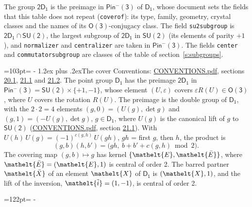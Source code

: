 \documentclass[10pt,a4paper]{article}
\makeatletter
\renewcommand\section{\@startsection{section}{1}{\z@}{-3ex plus -1ex minus -.2ex}%
  {1.2ex plus .2ex}{\normalfont\large\sffamily\bfseries\color{parttitle}}}
\newcommand{\needspace}[1]{\par\penalty-100\begingroup\dimen0=#1\relax\dimen2=\pagegoal
  \advance\dimen2-\pagetotal\ifdim\dimen0>\dimen2\relax\ifdim\dimen2>0pt\vfil\break\fi\fi
  \endgroup}
\numberwithin{equation}{section}
\newcommand{\eltfont}[1]{{\let\sigma\eltsigma\mathelt{#1}}}
\newcommand{\grp}[1]{\mathsf{#1}}
\newcommand{\elt}[1]{\eltfont{#1}}
\newcommand{\dirprod}{\times}
\newcommand{\barred}[1]{\bar{#1}}
\newcommand{\lift}[1]{\tilde{#1}}
\makeatother
\begin{document}
\leavevmode\label{n:element.inversion}\label{n:group.preimage}The group $\grp{2D_{1}}$ is the preimage in $\grp{Pin^{-}(3)}$ of \href{../../../rotation/data/pdf/D1.pdf}{$\grp{D_{1}}$}, whose document sets the fields that this table does not repeat (\texttt{coverof}): its type, family, geometry, crystal classes and the names of its \href{../../../rotation/data/pdf/O3.pdf}{$\grp{O(3)}$}-conjugacy class. The field \texttt{su2subgroup} is $\grp{2D_{1}} \cap \grp{SU(2)}$, the largest subgroup of $\grp{2D_{1}}$ in $\grp{SU(2)}$ (its elements of parity $+1$), and \texttt{normalizer} and \texttt{centralizer} are taken in $\grp{Pin^{-}(3)}$. The fields \texttt{center} and \texttt{commutatorsubgroup} are classes of the table of section~\ref{s:subgroups}.
\needspace{103pt}
\section{The cover}\label{s:cover}
Conventions: \href{../../CONVENTIONS.pdf}{CONVENTIONS.pdf}, sections \href{../../CONVENTIONS.pdf\#conv.20.1}{20.1}, \href{../../CONVENTIONS.pdf\#conv.21.1}{21.1} and \href{../../CONVENTIONS.pdf\#conv.21.2}{21.2}.
\leavevmode\label{n:group.pin.minus}\label{n:group.su2}\label{n:local.pin.sign}\label{n:matrix.covered}\label{n:matrix.lift.su2}\label{n:index.bar}The point group $\grp{D_{1}}$ has the preimage $\grp{2D_{1}}$ in $\grp{Pin^{-}(3)} = \grp{SU(2)} \dirprod \{+1, -1\}$, whose element $(U, \varepsilon)$ covers $\varepsilon R(U) \in \grp{O(3)}$, where $U$ covers the rotation $R(U)$. The preimage is the double group of $\grp{D_{1}}$, with the $2 \cdot 2 = 4$ elements $(g, 0) = (U(g), \det g)$ and $(g, 1) = (-U(g), \det g)$, $g \in \grp{D_{1}}$, where $U(g)$ is the canonical lift of $g$ to $\grp{SU(2)}$ (\href{../../CONVENTIONS.pdf}{CONVENTIONS.pdf}, section \href{../../CONVENTIONS.pdf\#conv.21.1}{21.1}). \label{n:function.cocycle}With $U(h)\,U(g) = (-1)^{c(g,h)}\,U(gh)$, $gh$ = first $g$, then $h$, the product is
\begin{equation}\label{e:product}(g, b)(h, b') = \bigl(gh,\ b + b' + c(g, h) \bmod 2\bigr).\end{equation}
\leavevmode\label{n:mark.bar}The covering map $(g, b) \mapsto g$ has kernel $\{\elt{E}, \elt{\barred{E}}\}$, where $\elt{\barred{E}} = (\elt{E}, 1)$ is central of order 2. \label{n:element.named}\label{n:mark.lift}The barred partner $\elt{\barred{X}}$ of an element $\elt{X}$ of $\grp{D_{1}}$ is $(\elt{X}, 1)$, and the lift of the inversion, $\elt{\lift{i}} = (1, -1)$, is central of order 2.
\needspace{122pt}
\end{document}
